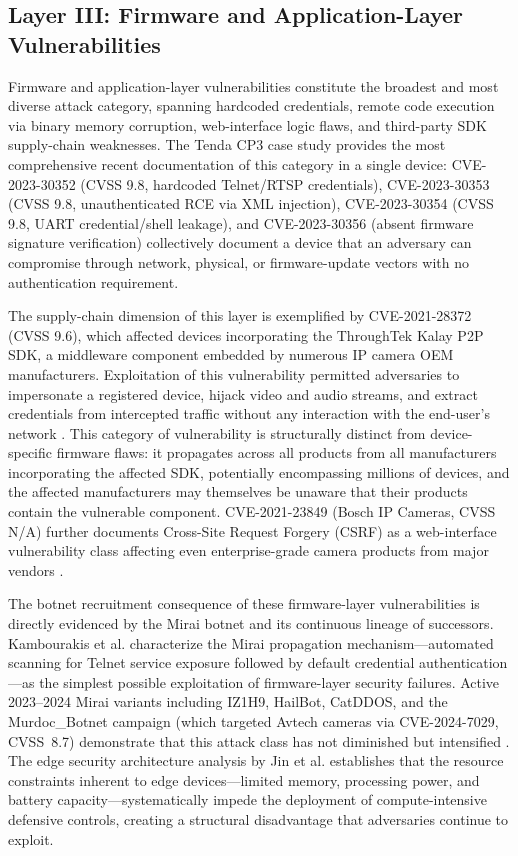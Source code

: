 \documentclass[letterpaper, 10pt, conference]{ieeeconf}
\begin{document}
\subsection{Layer III: Firmware and Application-Layer Vulnerabilities}

Firmware and application-layer vulnerabilities constitute the
broadest and most diverse attack category, spanning hardcoded
credentials, remote code execution via binary memory corruption,
web-interface logic flaws, and third-party SDK supply-chain weaknesses.
The Tenda CP3 case study \cite{stabili2024} provides the most
comprehensive recent documentation of this category in a single device:
CVE-2023-30352 (CVSS 9.8, hardcoded Telnet/RTSP credentials),
CVE-2023-30353 (CVSS 9.8, unauthenticated RCE via XML injection),
CVE-2023-30354 (CVSS 9.8, UART credential/shell leakage), and
CVE-2023-30356 (absent firmware signature verification) collectively
document a device that an adversary can compromise through network,
physical, or firmware-update vectors with no authentication requirement.

The supply-chain dimension of this layer is exemplified by
CVE-2021-28372 (CVSS 9.6), which affected devices incorporating the
ThroughTek Kalay P2P SDK, a middleware component embedded by numerous
IP camera OEM manufacturers. Exploitation of this vulnerability
permitted adversaries to impersonate a registered device, hijack video
and audio streams, and extract credentials from intercepted traffic
without any interaction with the end-user's network \cite{paloalto2021}.
This category of vulnerability is structurally distinct from
device-specific firmware flaws: it propagates across all products
from all manufacturers incorporating the affected SDK, potentially
encompassing millions of devices, and the affected manufacturers
may themselves be unaware that their products contain the vulnerable
component. CVE-2021-23849 (Bosch IP Cameras, CVSS N/A) further
documents Cross-Site Request Forgery (CSRF) as a web-interface
vulnerability class affecting even enterprise-grade camera products
from major vendors \cite{securithings2022}.

The botnet recruitment consequence of these firmware-layer
vulnerabilities is directly evidenced by the Mirai botnet and its
continuous lineage of successors. Kambourakis et al. \cite{kambourakis2017}
characterize the Mirai propagation mechanism---automated scanning for
Telnet service exposure followed by default credential authentication---as
the simplest possible exploitation of firmware-layer security failures.
Active 2023--2024 Mirai variants including IZ1H9, HailBot, CatDDOS,
and the Murdoc\_Botnet campaign (which targeted Avtech cameras via
CVE-2024-7029, CVSS~8.7) demonstrate that this attack class has not
diminished but intensified \cite{ddosreview2024}. The edge security
architecture analysis by Jin et al. \cite{jin2022edge} establishes
that the resource constraints inherent to edge devices---limited memory,
processing power, and battery capacity---systematically impede the
deployment of compute-intensive defensive controls, creating a
structural disadvantage that adversaries continue to exploit.
\end{document}
